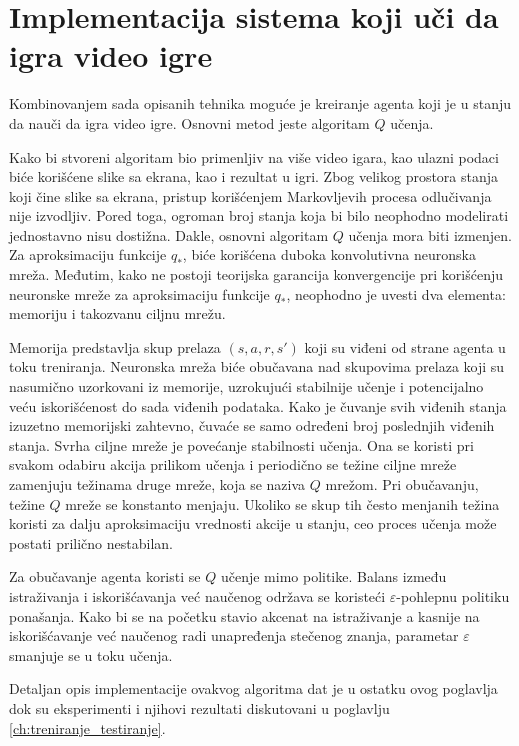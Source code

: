 \chapter{Implementacija sistema koji uči da igra video igre}
\label{ch:implementacija}

Kombinovanjem sada opisanih tehnika moguće je kreiranje agenta koji je u stanju da nauči da igra video igre. Osnovni metod jeste algoritam $Q$ učenja. 
\par 
Kako bi stvoreni algoritam bio primenljiv na više video igara, kao ulazni podaci biće korišćene slike sa ekrana, kao i rezultat u igri. Zbog velikog prostora stanja koji čine slike sa ekrana, pristup korišćenjem Markovljevih procesa odlučivanja nije izvodljiv. Pored toga, ogroman broj stanja koja bi bilo neophodno modelirati jednostavno nisu dostižna.  Dakle, osnovni algoritam $Q$ učenja mora biti izmenjen. Za aproksimaciju funkcije $q_*$, biće korišćena duboka konvolutivna neuronska mreža. Međutim, kako ne postoji teorijska garancija konvergencije pri korišćenju neuronske mreže za aproksimaciju funkcije $q_*$, neophodno je uvesti dva elementa: memoriju i takozvanu ciljnu mrežu. 
\par 
Memorija predstavlja skup prelaza $(s, a, r, s')$ koji su viđeni od strane agenta u toku treniranja. Neuronska mreža biće obučavana nad skupovima prelaza koji su nasumično uzorkovani iz memorije, uzrokujući stabilnije učenje i potencijalno veću iskorišćenost do sada viđenih podataka. Kako je čuvanje svih viđenih stanja izuzetno memorijski zahtevno, čuvaće se samo određeni broj poslednjih viđenih stanja. Svrha ciljne mreže je povećanje stabilnosti učenja. Ona se koristi pri svakom odabiru akcija prilikom učenja i periodično se težine ciljne mreže zamenjuju težinama druge mreže, koja se naziva $Q$ mrežom. Pri obučavanju, težine $Q$ mreže se konstanto menjaju. Ukoliko se skup tih često menjanih težina koristi za dalju aproksimaciju vrednosti akcije u stanju, ceo proces učenja može postati prilično nestabilan. 
\par 
Za obučavanje agenta koristi se $Q$ učenje mimo politike. Balans između istraživanja i iskorišćavanja već naučenog održava se koristeći $\varepsilon$-pohlepnu politiku ponašanja. Kako bi se na početku stavio akcenat na istraživanje a kasnije na iskorišćavanje već naučenog radi unapređenja stečenog znanja, parametar $\varepsilon$ smanjuje se u toku učenja.
\par 
Detaljan opis implementacije ovakvog algoritma dat je u ostatku ovog poglavlja dok su eksperimenti i njihovi rezultati diskutovani u poglavlju \ref{ch:treniranje_testiranje}.
